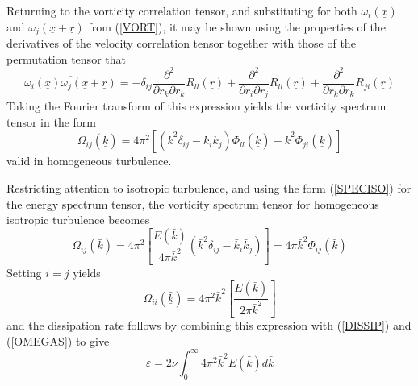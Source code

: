 \documentclass[dvips]{article}
\begin{document}
Returning to the vorticity correlation tensor, and 
substituting for both $\omega_{i}(\underline{x})$ and
$\omega_{j}(\underline{x}+\underline{r})$ from (\ref{VORT}), it may be
shown using the properties of the derivatives of the velocity correlation tensor
\cite{hinze} together with those of the permutation tensor \cite{eisele+mason}
that
\begin{equation}
\overline{\omega_{i}(\underline{x})\omega_{j}(\underline{x}+\underline{r})}
= -\delta_{ij}
 \frac{\partial^{2}}{\partial r_{k}\partial r_{k}} R_{ll}(\underline{r})
+\frac{\partial^{2}}{\partial r_{i}\partial r_{j}} R_{ll}(\underline{r})
+\frac{\partial^{2}}{\partial r_{k}\partial r_{k}} R_{ji}(\underline{r})
\label{VORTENSR}
\end{equation}
Taking the Fourier transform of this expression yields the vorticity
spectrum tensor in the form
\begin{equation}
\Omega_{ij}(\underline{\bar{k}}) = 
4\pi^{2}\left[\left(\bar{k}^{2}\delta_{ij}
-\bar{k}_{i}\bar{k}_{j}\right)\Phi_{ll}(\underline{\bar{k}})
-\bar{k}^{2}\Phi_{ji}(\underline{\bar{k}})\right]
\label{VORTHOMO}
\end{equation}
valid in homogeneous turbulence.

Restricting attention to isotropic turbulence, and using the form
(\ref{SPECISO}) for the energy spectrum tensor,
the vorticity spectrum tensor for homogeneous isotropic turbulence
becomes
\[
\Omega_{ij}(\underline{\bar{k}}) 
= 4\pi^{2}\left[\frac{E(\bar{k})}{4\pi
\bar{k}^{2}}(\bar{k}^{2}\delta_{ij}-\bar{k}_{i}\bar{k}_{j})\right]
= 4\pi \bar{k}^{2}\Phi_{ij}(\bar{k})
 \]
Setting $i=j$ yields
\[
\Omega_{ii}(\underline{\bar{k}}) 
= 4\pi^{2}\bar{k}^{2}\left[\frac{E(\bar{k})}{2\pi \bar{k}^{2}}\right]
\]
and the dissipation rate follows by combining this expression with
(\ref{DISSIP}) and (\ref{OMEGAS}) to give
\begin{equation}
\varepsilon = 2\nu \int_{0}^{\infty} 4\pi^{2}\bar{k}^{2} E(\bar{k})
d\bar{k}
\label{DISSIPEK}
\end{equation}
\end{document}
